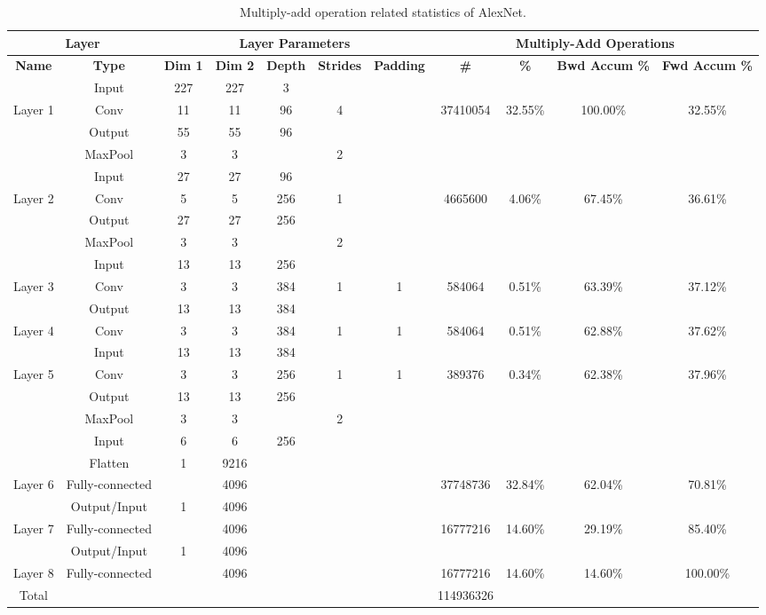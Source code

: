 \documentclass[11pt]{article}
\begin{document}
\begin{table}[H]
  \centering
  \tiny
  \begin{tabular}{ccccccccccc}
  \hline
  \multicolumn{2}{c}{\textbf{Layer}} & \multicolumn{5}{c}{\textbf{Layer Parameters}} & \multicolumn{4}{c}{\textbf{Multiply-Add Operations}} \\ \hline
  \textbf{Name} & \textbf{Type} & \textbf{Dim 1} & \textbf{Dim 2} & \textbf{Depth} & \textbf{Strides} & \textbf{Padding} & \textbf{\#} & \textbf{\%} & \textbf{Bwd Accum \%} & \textbf{Fwd Accum \%} \\ \hline
   & Input & 227 & 227 & 3 &  &  &  &  &  &  \\
  Layer 1 & Conv & 11 & 11 & 96 & 4 &  & 37410054 & 32.55\% & 100.00\% & 32.55\% \\\hline
   & Output & 55 & 55 & 96 &  &  &  &  &  &  \\
   & MaxPool & 3 & 3 &  & 2 &  &  &  &  &  \\
   & Input & 27 & 27 & 96 &  &  &  &  &  &  \\
  Layer 2 & Conv & 5 & 5 & 256 & 1 &  & 4665600 & 4.06\% & 67.45\% & 36.61\% \\\hline
   & Output & 27 & 27 & 256 &  &  &  &  &  &  \\
   & MaxPool & 3 & 3 &  & 2 &  &  &  &  &  \\
   & Input & 13 & 13 & 256 &  &  &  &  &  &  \\
  Layer 3 & Conv & 3 & 3 & 384 & 1 & 1 & 584064 & 0.51\% & 63.39\% & 37.12\% \\\hline
   & Output & 13 & 13 & 384 &  &  &  &  &  &  \\
  Layer 4 & Conv & 3 & 3 & 384 & 1 & 1 & 584064 & 0.51\% & 62.88\% & 37.62\% \\\hline
   & Input & 13 & 13 & 384 &  &  &  &  &  &  \\
  Layer 5 & Conv & 3 & 3 & 256 & 1 & 1 & 389376 & 0.34\% & 62.38\% & 37.96\% \\\hline
   & Output & 13 & 13 & 256 &  &  &  &  &  &  \\
   & MaxPool & 3 & 3 &  & 2 &  &  &  &  &  \\
   & Input & 6 & 6 & 256 &  &  &  &  &  &  \\
   & Flatten & 1 & 9216 &  &  &  &  &  &  &  \\
  Layer 6 & Fully-connected &  & 4096 &  &  &  & 37748736 & 32.84\% & 62.04\% & 70.81\% \\\hline
   & Output/Input & 1 & 4096 &  &  &  &  &  &  &  \\
  Layer 7 & Fully-connected &  & 4096 &  &  &  & 16777216 & 14.60\% & 29.19\% & 85.40\% \\\hline
   & Output/Input & 1 & 4096 &  &  &  &  &  &  &  \\
  Layer 8 & Fully-connected &  & 4096 &  &  &  & 16777216 & 14.60\% & 14.60\% & 100.00\% \\\hline
  Total &  &  &  &  &  &  & 114936326 &  &  &  \\ \hline
  \end{tabular}
  \caption{Multiply-add operation related statistics of AlexNet.\label{tab:alexnet}}
  \end{table}
\end{document}
